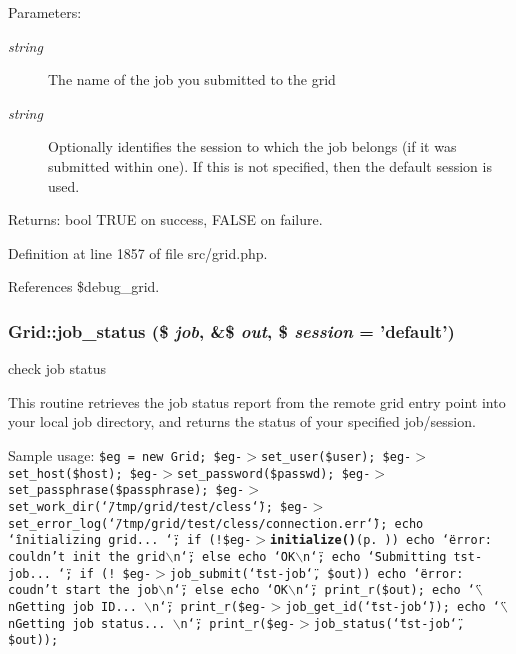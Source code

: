 \begin{Desc}
\item[Parameters:]
\begin{description}
\item[{\em string}]The name of the job you submitted to the grid \item[{\em string}]Optionally identifies the session to which the job belongs (if it was submitted within one). If this is not specified, then the default session is used. \end{description}
\end{Desc}
\begin{Desc}
\item[Returns:]bool TRUE on success, FALSE on failure. \end{Desc}


Definition at line 1857 of file src/grid.php.

References \$debug\_\-grid.
\subsubsection{\setlength{\rightskip}{0pt plus 5cm}Grid::job\_\-status (\$ {\em job}, \&\$ {\em out}, \$ {\em session} = 'default')}\label{classGrid_a49}


check job status 

This routine retrieves the job status report from the remote grid entry point into your local job directory, and returns the status of your specified job/session.

Sample usage: {\tt  \$eg = new Grid; \$eg-$>$set\_\-user(\$user); \$eg-$>$set\_\-host(\$host); \$eg-$>$set\_\-password(\$passwd); \$eg-$>$set\_\-passphrase(\$passphrase); \$eg-$>$set\_\-work\_\-dir(\char`\"{}/tmp/grid/test/cless\char`\"{}); \$eg-$>$set\_\-error\_\-log(\char`\"{}/tmp/grid/test/cless/connection.err\char`\"{}); echo \char`\"{}initializing grid... \char`\"{}; if (!\$eg-$>${\bf initialize()}{\rm (p.\,\pageref{classGrid_a11})}) echo \char`\"{}error: couldn't init the grid$\backslash$n\char`\"{}; else echo \char`\"{}OK$\backslash$n\char`\"{}; echo \char`\"{}Submitting tst-job... \char`\"{}; if (! \$eg-$>$job\_\-submit(\char`\"{}tst-job\char`\"{}, \$out)) echo \char`\"{}error: coudn't start the job$\backslash$n\char`\"{}; else echo \char`\"{}OK$\backslash$n\char`\"{}; print\_\-r(\$out); echo \char`\"{}$\backslash$n\-Getting job ID... $\backslash$n\char`\"{}; print\_\-r(\$eg-$>$job\_\-get\_\-id(\char`\"{}tst-job\char`\"{})); echo \char`\"{}$\backslash$n\-Getting job status... $\backslash$n\char`\"{}; print\_\-r(\$eg-$>$job\_\-status(\char`\"{}tst-job\char`\"{}, \$out)); }

